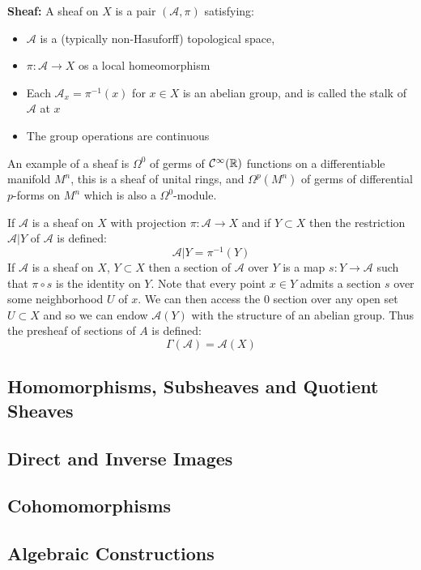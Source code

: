 \begin{definition}
    \textbf{Sheaf: }A sheaf on $X$ is a pair $(\mathcal{A}, \pi)$ satisfying:
    \begin{itemize}
        \item $\mathcal{A}$ is a (typically non-Hasuforff) topological space,
        \item $\pi: \mathcal{A}\to X$ os a local homeomorphism
        \item Each $\mathcal{A}_x = \pi^{-1}(x)$ for $x\in X$ is an abelian group, and is called the stalk of $\mathcal{A}$ at $x$
        \item The group operations are continuous
    \end{itemize}
\end{definition}
An example of a sheaf is $\Omega^0$ of germs of $\mathcal{C}^\infty(\mathbb{R})$ functions on a differentiable manifold $M^n$, this is a sheaf of unital rings, and $\Omega^p(M^n)$ of germs of differential $p$-forms on $M^n$ which is also a $\Omega^0$-module.

If $\mathcal{A}$ is a sheaf on $X$ with projection $\pi: \mathcal{A}\to X$ and if $Y\subset X$ then the restriction $\mathcal{A}|Y$ of $\mathcal{A}$ is defined:
\[\mathcal{A}|Y = \pi^{-1}(Y)\]
If $\mathcal{A}$ is a sheaf on $X$, $Y \subset X$ then a section of $\mathcal{A}$ over $Y$ is a map $s: Y\to\mathcal{A}$ such that $\pi \circ s$ is the identity on $Y$. Note that every point $x\in Y$ admits a section $s$ over some neighborhood $U$ of $x$. We can then access the $0$ section over any open set $U \subset X$ and so we can endow $\mathcal{A}(Y)$ with the structure of an abelian group. Thus the presheaf of sections of $A$ is defined:
\[\Gamma(\mathcal{A}) = \mathcal{A}(X)\]

\subsection{Homomorphisms, Subsheaves and Quotient Sheaves}
\subsection{Direct and Inverse Images}
\subsection{Cohomomorphisms}
\subsection{Algebraic Constructions}
